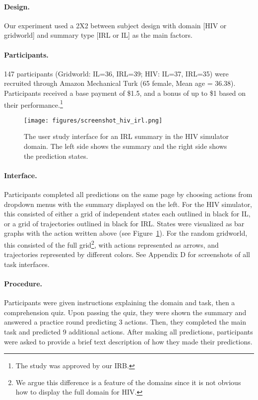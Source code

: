 \documentclass{article}
\begin{document}
\paragraph{Design.} Our experiment used a 2X2 between subject design with domain [HIV or gridworld] and summary type [IRL or IL] as the main factors.

\paragraph{Participants.} 147 participants (Gridworld: IL=36, IRL=39; HIV: IL=37, IRL=35) were recruited through Amazon Mechanical Turk (65 female, Mean age = 36.38). 
Participants received a base payment of \$1.5, and a bonus of up to \$1 based on their performance.\footnote{The study was approved by our IRB.}

\begin{figure}[h]
\centering
\texttt{[image: figures/screenshot\_hiv\_irl.png]}
\caption{The user study interface for an IRL summary in the HIV simulator domain. The left side shows the summary and the right side shows the prediction states.}
\label{fig:interface}
\vspace{-0.3cm}
\end{figure}

\paragraph{Interface.} Participants completed all predictions on the same page by choosing actions from dropdown menus with the summary displayed on the left. For the HIV simulator, this consisted of either a grid of independent states each outlined in black for IL, or a grid of trajectories outlined in black for IRL. States were visualized as bar graphs with the action written above (see Figure~\ref{fig:interface}). For the random gridworld, this consisted of the full grid\footnote{We argue this difference is a feature of the domains since it is not obvious how to display the full domain for HIV.}, with actions represented as arrows, and trajectories represented by different colors. See \cite{lage2019policysummarization} Appendix D for screenshots of all task interfaces.

\paragraph{Procedure.} 
Participants were given instructions explaining the domain and task, then a comprehension quiz. Upon passing the quiz, they were shown the summary and answered a practice round predicting 3 actions. Then, they completed the main task and predicted 9 additional actions. After making all predictions, participants were asked to provide a brief text description of how they made their predictions.
\end{document}
